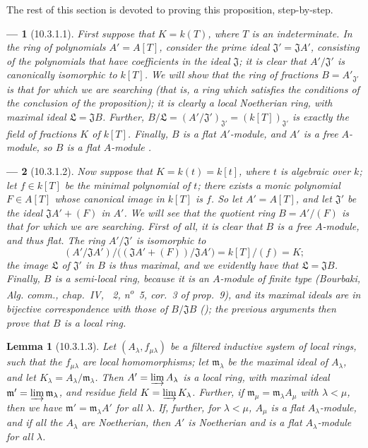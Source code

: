 \documentclass[oneside]{amsart}
\theoremstyle{ega-env-style}
\newtheorem*{env}{---}
\theoremstyle{ega-thm-env-style}
\newtheorem*{lemma}{Lemma}
\theoremstyle{ega-defn-env-style}
\newcommand{\oldpage}[2][]{{\marginnote{\normalfont{\textbf{#1}~|~#2}}}\ignorespaces}
\let\EGAOriginalLabel\label
\renewcommand{\label}[1]{\phantomsection\EGAOriginalLabel{#1}}
\begin{document}
The rest of this section is devoted to proving this proposition, step-by-step.
\begin{env}[10.3.1.1]
\label{0.10.3.1.1}
First suppose that $K=k(T)$, where $T$ is an indeterminate.
In the ring of polynomials $A'=A[T]$, consider the prime ideal $\mathfrak{J}'=\mathfrak{J}A'$, consisting of the
\oldpage[0\textsubscript{III-1}]{21}
polynomials that have coefficients in the ideal $\mathfrak{J}$;
it is clear that $A'/\mathfrak{J}'$ is canonically isomorphic to $k[T]$.
We will show that the ring of fractions $B=A'_{\mathfrak{J}'}$ is that for which we are searching (that is, a ring which satisfies the conditions of the conclusion of the proposition);
it is clearly a local Noetherian ring, with maximal ideal $\mathfrak{L}=\mathfrak{J}B$.
Further, $B/\mathfrak{L}=(A'/\mathfrak{J}')_{\mathfrak{J}'}=(k[T])_{\mathfrak{J}'}$ is exactly the field of fractions $K$ of $k[T]$.
Finally, $B$ is a flat $A'$-module, and $A'$ is a free $A$-module, so $B$ is a flat $A$-module .
\end{env}

\begin{env}[10.3.1.2]
\label{0.10.3.1.2}
Now suppose that $K=k(t)=k[t]$, where $t$ is algebraic over $k$;
let $f\in k[T]$ be the minimal polynomial of $t$;
there exists a monic polynomial $F\in A[T]$ whose canonical image in $k[T]$ is $f$.
So let $A'=A[T]$, and let $\mathfrak{J}'$ be the ideal $\mathfrak{J}A'+(F)$ in $A'$.
We will see that the quotient ring $B=A'/(F)$ is that for which we are searching.
First of all, it is clear that $B$ is a \emph{free} $A$-module, and thus flat.
The ring $A'/\mathfrak{J}'$ is isomorphic to
\[
  (A'/\mathfrak{J}A')/\big((\mathfrak{J}A'+(F))/\mathfrak{J}A'\big)=k[T]/(f)=K;
\]
the image $\mathfrak{L}$ of $\mathfrak{J}'$ in $B$ is thus maximal, and we evidently have that $\mathfrak{L}=\mathfrak{J}B$.
Finally, $B$ is a semi-local ring, because it is an $A$-module of finite type (Bourbaki, \emph{Alg. comm.}, chap.~IV, \textsection~2, n\textsuperscript{o}~5, cor.~3 of prop.~9), and its maximal ideals are in bijective correspondence with those of $B/\mathfrak{J}B$ (\cite[vol.~I, p.~259]{I-13});
the previous arguments then prove that $B$ is a local ring.
\end{env}

\begin{lemma}[10.3.1.3]
\label{0.10.3.1.3}
Let $(A_\lambda,f_{\mu\lambda})$ be a filtered inductive system of local rings, such that the $f_{\mu\lambda}$ are local homomorphisms;
let $\mathfrak{m}_\lambda$ be the maximal ideal of $A_\lambda$, and let $K_\lambda=A_\lambda/\mathfrak{m}_\lambda$.
Then $A'=\varinjlim A_\lambda$ is a local ring, with maximal ideal $\mathfrak{m}'=\varinjlim\mathfrak{m}_\lambda$, and residue field $K=\varinjlim K_\lambda$.
Further, if $\mathfrak{m}_\mu=\mathfrak{m}_\lambda A_\mu$ with $\lambda<\mu$, then we have $\mathfrak{m}'=\mathfrak{m}_\lambda A'$ for all $\lambda$.
If, further, for $\lambda<\mu$, $A_\mu$ is a flat $A_\lambda$-module, and if all the $A_\lambda$ are Noetherian, then $A'$ is Noetherian and is a flat $A_\lambda$-module for all $\lambda$.
\end{lemma}
\end{document}

